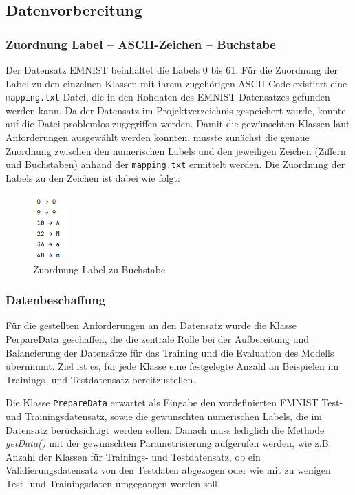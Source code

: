 \documentclass[12pt,oneside]{article}
\begin{document}
  \subsection{Datenvorbereitung}
		\subsubsection{Zuordnung Label – ASCII-Zeichen – Buchstabe}
			Der Datensatz EMNIST \cite{noauthor_emnist_nodate} beinhaltet die Labels 0 bis 61. Für die Zuordnung der Label zu den einzelnen Klassen mit ihrem zugehörigen ASCII-Code existiert eine \texttt{mapping.txt}-Datei, die in den Rohdaten des EMNIST Datensatzes gefunden werden kann. Da der Datensatz im Projektverzeichnis gespeichert wurde, konnte auf die Datei problemlos zugegriffen werden. 
			Damit die gewünschten Klassen laut Anforderungen ausgewählt werden konnten, musste zunächst die genaue Zuordnung zwischen den numerischen Labels und den jeweiligen Zeichen (Ziffern und Buchstaben) anhand der \texttt{mapping.txt} ermittelt werden. Die Zuordnung der Labels zu den Zeichen ist dabei wie folgt:
  
  
			\begin{figure}[h]
				\centering
				\includegraphics[height=2.5cm]{Bilder/Labelzuordnung}
				\caption{Zuordnung Label zu Buchstabe}
				\label{fig:labelzuordnung}
			\end{figure}

		\subsubsection{Datenbeschaffung}
			Für die gestellten Anforderungen an den Datensatz wurde die Klasse PerpareData geschaffen, die die zentrale Rolle bei der Aufbereitung und Balancierung der Datensätze für das Training und die Evaluation des Modells übernimmt. Ziel ist es, für jede Klasse eine festgelegte Anzahl an Beispielen im Trainings- und Testdatensatz bereitzustellen. 
			
			Die Klasse \texttt{PrepareData} erwartet als Eingabe den vordefinierten EMNIST Test- und Trainingsdatensatz, sowie die gewünschten numerischen Labels, die im Datensatz berücksichtigt werden sollen. Danach muss lediglich die Methode \textit{getData()} mit der gewünschten Parametrisierung aufgerufen werden, wie z.B. Anzahl der Klassen für Trainings- und Testdatensatz, ob ein Validierungsdatensatz von den Testdaten abgezogen oder wie mit zu wenigen Test- und Trainingsdaten umgegangen werden soll.
			
\end{document}
